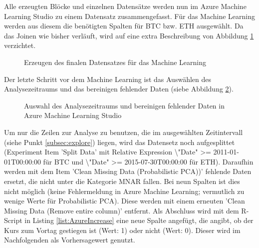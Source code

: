 Alle erzeugten Blöcke und einzelnen Datensätze werden nun im Azure Machine Learning Studio zu einem Datensatz zusammengefasst. Für das Machine Learning werden aus diesem die benötigten Spalten für BTC bzw. ETH ausgewählt. Da das Joinen wie bisher verläuft, wird auf eine extra Beschreibung von Abbildung \ref{fig:azureFinalSet} verzichtet.
\begin{figure}[H]
\centering
{}
\caption{Erzeugen des finalen Datensatzes für das Machine Learning}
\label{fig:azureFinalSet}
\end{figure}
Der letzte Schritt vor dem Machine Learning ist das Auswählen des Analysezeitraums und das bereinigen fehlender Daten (siebe Abbildung \ref{fig:azureDateAndCleaning}).
\begin{figure}[H]
\centering
{}
\caption{Auswahl des Analysezeitraums und bereinigen fehlender Daten in Azure Machine Learning Studio}
\label{fig:azureDateAndCleaning}
\end{figure}
Um nur die Zeilen zur Analyse zu benutzen, die im ausgewählten Zeitintervall (siehe Punkt \ref{subsec:explore}) liegen, wird das Datensetz noch aufgesplittet (Experiment Item 'Split Data' mit Relative Expression \textbackslash "Date" >= 2011-01-01T00:00:00 für BTC und \textbackslash "Date" >= 2015-07-30T00:00:00 für ETH). Daraufhin werden mit dem Item 'Clean Missing Data (Probabilistic PCA))' fehlende Daten ersetzt, die nicht unter die Kategorie MNAR fallen. Bei neun Spalten ist dies nicht möglich (keine Fehlermeldung in Azure Machine Learning; vermutlich zu wenige Werte für Probabilistic PCA). Diese werden mit einem erneuten 'Clean Missing Data (Remove entire column)' entfernt. Als Abschluss wird mit dem R-Script in Listing \ref{list:AzureIncrease} eine neue Spalte angefügt, die angibt, ob der Kurs zum Vortag gestiegen ist (Wert: 1) oder nicht (Wert: 0). Dieser wird im Nachfolgenden als Vorhersagewert genutzt.
